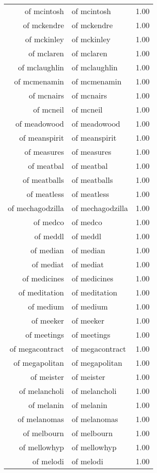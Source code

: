 \begin{table}[ht]
\begin{tabular}{rlr}
  of mcintosh & of mcintosh & 1.00 \\ 
  of mckendre & of mckendre & 1.00 \\ 
  of mckinley & of mckinley & 1.00 \\ 
  of mclaren & of mclaren & 1.00 \\ 
  of mclaughlin & of mclaughlin & 1.00 \\ 
  of mcmenamin & of mcmenamin & 1.00 \\ 
  of mcnairs & of mcnairs & 1.00 \\ 
  of mcneil & of mcneil & 1.00 \\ 
  of meadowood & of meadowood & 1.00 \\ 
  of meanspirit & of meanspirit & 1.00 \\ 
  of measures & of measures & 1.00 \\ 
  of meatbal & of meatbal & 1.00 \\ 
  of meatballs & of meatballs & 1.00 \\ 
  of meatless & of meatless & 1.00 \\ 
  of mechagodzilla & of mechagodzilla & 1.00 \\ 
  of medco & of medco & 1.00 \\ 
  of meddl & of meddl & 1.00 \\ 
  of median & of median & 1.00 \\ 
  of mediat & of mediat & 1.00 \\ 
  of medicines & of medicines & 1.00 \\ 
  of meditation & of meditation & 1.00 \\ 
  of medium & of medium & 1.00 \\ 
  of meeker & of meeker & 1.00 \\ 
  of meetings & of meetings & 1.00 \\ 
  of megacontract & of megacontract & 1.00 \\ 
  of megapolitan & of megapolitan & 1.00 \\ 
  of meister & of meister & 1.00 \\ 
  of melancholi & of melancholi & 1.00 \\ 
  of melanin & of melanin & 1.00 \\ 
  of melanomas & of melanomas & 1.00 \\ 
  of melbourn & of melbourn & 1.00 \\ 
  of mellowhyp & of mellowhyp & 1.00 \\ 
  of melodi & of melodi & 1.00 \\ 

\end{tabular}
\end{table}
